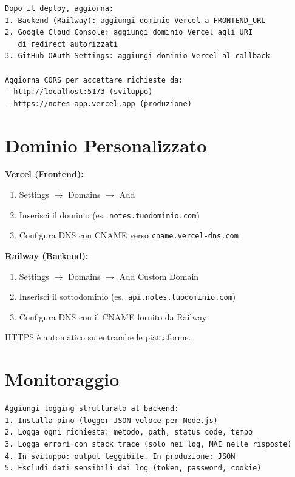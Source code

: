 \begin{praticabox}[title={Pratica --- Aggiorna CORS e OAuth}]
\begin{lstlisting}[language={}]
Dopo il deploy, aggiorna:
1. Backend (Railway): aggiungi dominio Vercel a FRONTEND_URL
2. Google Cloud Console: aggiungi dominio Vercel agli URI
   di redirect autorizzati
3. GitHub OAuth Settings: aggiungi dominio Vercel al callback

Aggiorna CORS per accettare richieste da:
- http://localhost:5173 (sviluppo)
- https://notes-app.vercel.app (produzione)
\end{lstlisting}
\end{praticabox}

\section{Dominio Personalizzato}

\textbf{Vercel (Frontend):}
\begin{enumerate}
  \item Settings $\rightarrow$ Domains $\rightarrow$ Add
  \item Inserisci il dominio (es.\ \texttt{notes.tuodominio.com})
  \item Configura DNS con CNAME verso \texttt{cname.vercel-dns.com}
\end{enumerate}

\textbf{Railway (Backend):}
\begin{enumerate}
  \item Settings $\rightarrow$ Domains $\rightarrow$ Add Custom Domain
  \item Inserisci il sottodominio (es.\ \texttt{api.notes.tuodominio.com})
  \item Configura DNS con il CNAME fornito da Railway
\end{enumerate}

HTTPS è automatico su entrambe le piattaforme.

\section{Monitoraggio}

\begin{praticabox}[title={Pratica --- Logging di produzione}]
\begin{lstlisting}[language={}]
Aggiungi logging strutturato al backend:
1. Installa pino (logger JSON veloce per Node.js)
2. Logga ogni richiesta: metodo, path, status code, tempo
3. Logga errori con stack trace (solo nei log, MAI nelle risposte)
4. In sviluppo: output leggibile. In produzione: JSON
5. Escludi dati sensibili dai log (token, password, cookie)
\end{lstlisting}
\end{praticabox}

